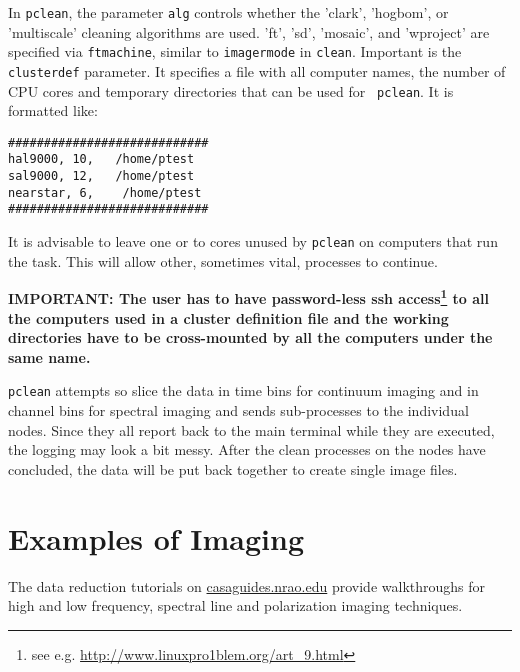 In {\tt pclean}, the parameter {\tt alg} controls whether the 'clark',
'hogbom', or 'multiscale' cleaning algorithms are used. 'ft', 'sd',
'mosaic', and 'wproject' are specified via {\tt ftmachine}, similar to
{\tt imagermode} in {\tt clean}. Important is the {\tt clusterdef}
parameter. It specifies a file with all computer names, the number of
CPU cores and temporary directories that can be used for {\tt
  pclean}. It is formatted like:

\small
\begin{verbatim}
############################
hal9000, 10,   /home/ptest
sal9000, 12,   /home/ptest
nearstar, 6,    /home/ptest
############################
\end{verbatim}
\normalsize

It is advisable to leave one or to cores unused by {\tt pclean} on
computers that run the task. This will allow other, sometimes vital,
processes to continue. 

{\bf IMPORTANT: The user has to have password-less ssh
  access\footnote{see e.g. \url{http://www.linuxpro1blem.org/art_9.html}} to all
  the computers used in a cluster definition file and the working
  directories have to be cross-mounted by all the computers under the
  same name.}


{\tt pclean} attempts so slice the data in time bins for continuum
imaging and in channel bins for spectral imaging and sends
sub-processes to the individual nodes. Since they all report back to
the main terminal while they are executed, the logging may look a bit
messy. After the clean processes on the nodes have concluded, the data will
be put back together to create single image files.




\section{Examples of Imaging}
\label{section:im.examples}

The data reduction tutorials on \url{casaguides.nrao.edu} provide
walkthroughs for
high and low frequency, spectral line and polarization imaging techniques. 

